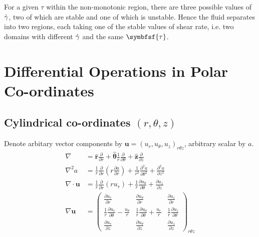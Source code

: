 \documentclass{jknotes}
\begin{document}
For a given $\tau$ within the non-monotonic region, there are three possible
values of $\dot{\gamma}$, two of which are stable and one of which is unstable.
Hence the fluid separates into two regions, each taking one of the stable
values of shear rate, i.e. two domains with different $\dot{\gamma}$ and the same
$\symbfsf{\tau}$.

\newpage
\appendix
\section{Differential Operations in Polar Co-ordinates}
\subsection{Cylindrical co-ordinates $(r,\theta,z)$}
Denote arbitary vector components by $\symbf{u} = (u_r, u_\theta,
u_z)_{r\theta z}$, arbitrary scalar by $a$.
\begingroup
\addtolength{\jot}{.7em}
\renewcommand*{\arraystretch}{2}
\setlength\arraycolsep{.7em}
\begin{align}
	\nabla &= \hat{\symbf{r}} \frac{\partial}{\partial r} +
	\hat{\symbf{\theta}} \frac{1}{r}\frac{\partial}{\partial \theta} +
	\hat{\symbf{z}}\frac{\partial}{\partial z} \\
	\nabla^2 a &= \frac{1}{r}\frac{\partial}{\partial r} \left( r\frac{\partial
		a}{\partial r}\right) + \frac{1}{r^2} \frac{\partial^2
		a}{\partial \theta^2} + \frac{\partial^2
	a}{\partial z^2} \\
	\nabla \cdot \symbf{u} &= \frac{1}{r} \frac{\partial}{\partial r}(r
	u_r) + \frac{1}{r} \frac{\partial u_\theta}{\partial \theta} +
	\frac{\partial u_z}{\partial z} \\
	\nabla \symbf{u} &= \begin{pmatrix} \frac{\partial u_r}{\partial r} &
	\frac{\partial u_\theta}{\partial r} & \frac{\partial u_z}{\partial r}
	\\ \frac{1}{r}\frac{\partial u_r}{\partial \theta} -
	\frac{u_\theta}{r} & \frac{1}{r}\frac{\partial u_\theta}{\partial
	\theta} +\frac{u_r}{r} & \frac{1}{r}\frac{\partial u_z}{\partial \theta} \\
	\frac{\partial u_r}{\partial z} & \frac{\partial u_\theta}{\partial z}
	& \frac{\partial u_z}{\partial z} \end{pmatrix}_{r\theta z}
\end{align}
\endgroup
\end{document}
